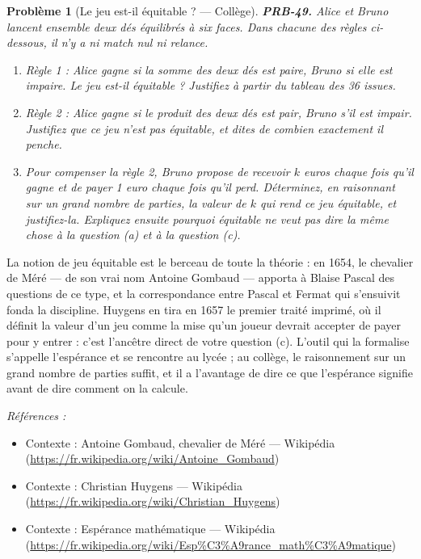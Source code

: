 \documentclass[11pt]{article}
\newtheorem{problem}{Problème}
\newenvironment{refs}{\par\small\noindent\emph{Références :}\begin{itemize}\setlength\itemsep{0pt}}{\end{itemize}\normalsize}
\begin{document}
\bigskip

\begin{problem}[{Le jeu est-il équitable ? --- Collège}]
\textbf{PRB-49.} Alice et Bruno lancent ensemble deux dés équilibrés à six faces. Dans chacune
des règles ci-dessous, il n'y a ni match nul ni relance.
\begin{enumerate}
\item[(a)] Règle 1 : Alice gagne si la somme des deux dés est paire, Bruno si elle est impaire. Le jeu
est-il équitable ? Justifiez à partir du tableau des 36 issues.
\item[(b)] Règle 2 : Alice gagne si le produit des deux dés est pair, Bruno s'il est impair. Justifiez
que ce jeu n'est pas équitable, et dites de combien exactement il penche.
\item[(c)] Pour compenser la règle 2, Bruno propose de recevoir $ k $ euros chaque fois qu'il gagne et
de payer 1 euro chaque fois qu'il perd. Déterminez, en raisonnant sur un grand nombre de parties,
la valeur de $ k $ qui rend ce jeu équitable, et justifiez-la. Expliquez ensuite pourquoi
\og{} équitable \fg{} ne veut pas dire la même chose à la question (a) et à la question (c).
\end{enumerate}

\end{problem}

\noindent La notion de jeu équitable est le berceau de toute la théorie : en 1654, le
chevalier de Méré --- de son vrai nom Antoine Gombaud --- apporta à Blaise Pascal des questions de ce
type, et la correspondance entre Pascal et Fermat qui s'ensuivit fonda la discipline. Huygens en
tira en 1657 le premier traité imprimé, où il définit la valeur d'un jeu comme la mise qu'un joueur
devrait accepter de payer pour y entrer : c'est l'ancêtre direct de votre question (c). L'outil qui
la formalise s'appelle l'espérance et se rencontre au lycée ; au collège, le raisonnement \og{} sur un
grand nombre de parties \fg{} suffit, et il a l'avantage de dire ce que l'espérance signifie avant de
dire comment on la calcule.

\begin{refs}
\item Contexte : Antoine Gombaud, chevalier de Méré --- Wikipédia (\url{https://fr.wikipedia.org/wiki/Antoine_Gombaud})
\item Contexte : Christian Huygens --- Wikipédia (\url{https://fr.wikipedia.org/wiki/Christian_Huygens})
\item Contexte : Espérance mathématique --- Wikipédia (\url{https://fr.wikipedia.org/wiki/Esp%C3%A9rance_math%C3%A9matique})
\end{refs}
\end{document}
